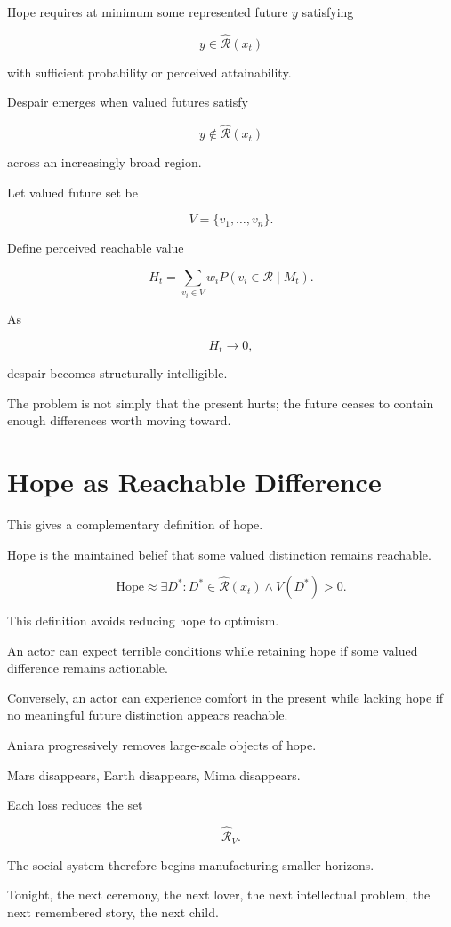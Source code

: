 \documentclass[11pt,oneside]{book}
\theoremstyle{definition}
\theoremstyle{remark}
\newcommand{\R}{\mathcal{R}}
\begin{document}
Hope requires at minimum some represented future \(y\) satisfying

\[
y\in\widehat{\R}(x_t)
\]

with sufficient probability or perceived attainability.

Despair emerges when valued futures satisfy

\[
y\notin\widehat{\R}(x_t)
\]

across an increasingly broad region.

Let valued future set be

\[
V=\{v_1,\ldots,v_n\}.
\]

Define perceived reachable value

\[
H_t
=
\sum_{v_i\in V}
w_i
P(v_i\in\R\mid M_t).
\]

As

\[
H_t\rightarrow0,
\]

despair becomes structurally intelligible.

The problem is not simply that the present hurts; the future ceases to contain enough differences worth moving toward.

\section{Hope as Reachable Difference}

This gives a complementary definition of hope.

Hope is the maintained belief that some valued distinction remains reachable.

\[
\boxed{
\text{Hope}
\approx
\exists D^\ast:
D^\ast\in\widehat{\R}(x_t)
\land
V(D^\ast)>0.
}
\]

This definition avoids reducing hope to optimism.

An actor can expect terrible conditions while retaining hope if some valued difference remains actionable.

Conversely, an actor can experience comfort in the present while lacking hope if no meaningful future distinction appears reachable.

Aniara progressively removes large-scale objects of hope.

Mars disappears, Earth disappears, Mima disappears.

Each loss reduces the set

\[
\widehat{\R}_V.
\]

The social system therefore begins manufacturing smaller horizons.

Tonight, the next ceremony, the next lover, the next intellectual problem, the next remembered story, the next child.
\end{document}

